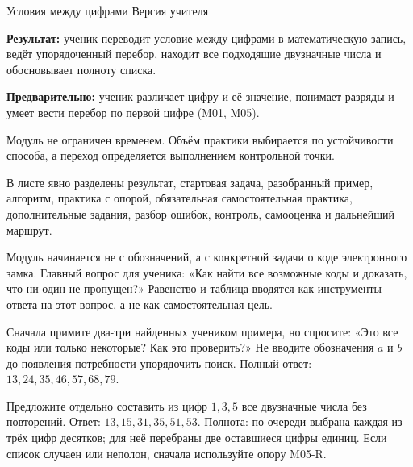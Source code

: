 \worksheettitle
  {Условия между цифрами}
  { Версия учителя}

\begin{teacherbox}
  \textbf{Результат:} ученик переводит условие между цифрами в математическую
  запись, ведёт упорядоченный перебор, находит все подходящие двузначные числа
  и обосновывает полноту списка.

  \textbf{Предварительно:} ученик различает цифру и её значение, понимает
  разряды и умеет вести перебор по первой цифре (M01, M05).

  Модуль не ограничен временем. Объём практики выбирается по устойчивости
  способа, а переход определяется выполнением контрольной точки.
\end{teacherbox}

\begin{teacherbox}
  В листе явно разделены результат, стартовая задача, разобранный пример,
  алгоритм, практика с опорой, обязательная самостоятельная практика,
  дополнительные задания, разбор ошибок, контроль, самооценка и дальнейший
  маршрут.
\end{teacherbox}

\begin{teacherbox}
  Модуль начинается не с обозначений, а с конкретной задачи о коде
  электронного замка. Главный вопрос для ученика: «Как найти все возможные
  коды и доказать, что ни один не пропущен?» Равенство и таблица вводятся как
  инструменты ответа на этот вопрос, а не как самостоятельная цель.
\end{teacherbox}

\begin{teacherbox}
  Сначала примите два-три найденных учеником примера, но спросите: «Это все
  коды или только некоторые? Как это проверить?» Не вводите обозначения
  \(a\) и \(b\) до появления потребности упорядочить поиск. Полный ответ:
  \(13,24,35,46,57,68,79\).
\end{teacherbox}

\begin{checkpointbox}
  Предложите отдельно составить из цифр \(1,3,5\) все двузначные числа без
  повторений. Ответ:
  \(13,15,31,35,51,53\). Полнота: по очереди выбрана каждая из трёх цифр
  десятков; для неё перебраны две оставшиеся цифры единиц. Если список случаен
  или неполон, сначала используйте опору M05-R.
\end{checkpointbox}

